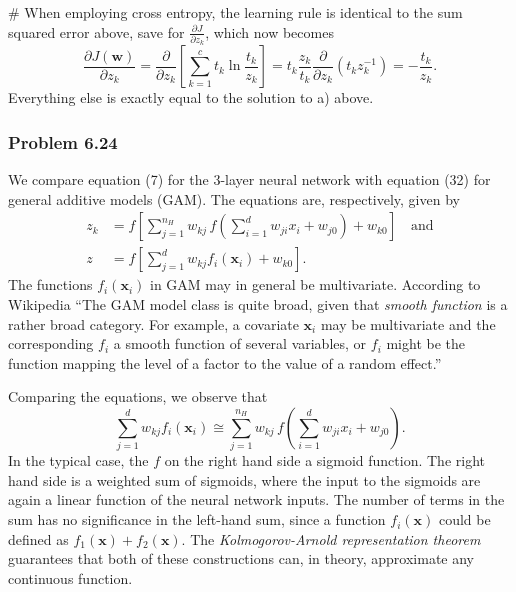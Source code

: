\documentclass[12pt, a4paper]{article}
\newcommand{\vect}[1]{\bm{#1}}
\begin{document}
{\begin{easylist}[enumerate]
# When employing cross entropy, the learning rule is identical to the sum squared error above, save for $\frac{\partial J}{\partial z_k}$, which now becomes
\begin{equation*}
\frac{\partial J (\vect{w})}{\partial z_k} = \frac{\partial }{\partial z_k} 
\left[
\sum_{k=1}^{c} t_k \ln \frac{t_k}{z_k}
\right]
= 
t_k \frac{z_k}{t_k} \frac{\partial }{\partial z_k}  \left( t_k z_k^{-1} \right)
=
- \frac{t_k}{z_k}.
\end{equation*}
Everything else is exactly equal to the solution to a) above.
\end{easylist}



\subsubsection*{Problem 6.24}

We compare equation (7) for the 3-layer neural network with equation (32) for general additive models (GAM).
The equations are, respectively, given by
\begin{align*}
	z_k &= f\left[
	\sum_{j=1}^{n_H} w_{kj} \, f \left( \sum_{i=1}^{d} w_{ji} x_i + w_{j0} \right) + w_{k0}
	\right] \quad \text{and}\\
	z &= f\left[
	\sum_{j=1}^{d} w_{kj}  f_i \left( \vect{x}_i \right) + w_{k0}
	\right] .
\end{align*}
The functions $f_i(\vect{x}_i)$ in GAM may in general be multivariate.
According to Wikipedia ``The GAM model class is quite broad, given that \emph{smooth function} is a rather broad category. For example, a covariate $\vect{x}_i$ may be multivariate and the corresponding $f_i$  a smooth function of several variables, or  $f_i$ might be the function mapping the level of a factor to the value of a random effect.''

Comparing the equations, we observe that
\begin{equation*}
	\sum_{j=1}^{d} w_{kj}  f_i \left( \vect{x}_i \right) \cong
	\sum_{j=1}^{n_H} w_{kj} \, f \left( \sum_{i=1}^{d} w_{ji} x_i + w_{j0} \right).
\end{equation*}
In the typical case, the $f$ on the right hand side a sigmoid function.
The right hand side is a weighted sum of sigmoids, where the input to the sigmoids are again a linear function of the neural network inputs.
The number of terms in the sum has no significance in the left-hand sum, since a function $f_i(\vect{x})$ could be defined as $f_1(\vect{x}) + f_2(\vect{x})$.
The \emph{Kolmogorov-Arnold representation theorem} guarantees that both of these constructions can, in theory, approximate any continuous function.



}
\end{document}
